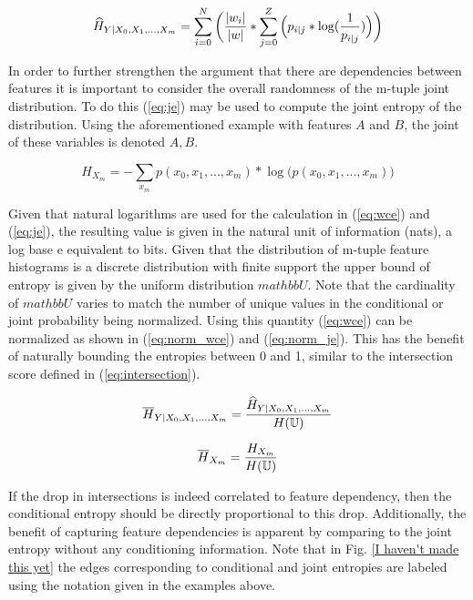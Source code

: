 \begin{equation}
\label{eq:wce}
\widehat{H}_{Y|X_0, X_1, ..., X_m} = \sum_{i=0}^{N} \bigg({{|w_i|} \over {|w|}} * {\sum_{j=0}^{Z}\Big({p_{i|j} * \log ({1 \over{p_{i|j}}})}\Big)}\bigg)
\end{equation}

In order to further strengthen the argument that there are dependencies between features it is important to consider the overall randomness of the m-tuple joint distribution. To do this (\ref{eq:je}) may be used to compute the joint entropy of the distribution. Using the aforementioned example with features $A$ and $B$, the joint of these variables is denoted $A,B$.

\begin{equation}
\label{eq:je}
{H}_{X_m} = -\sum_{x_m} p(x_0, x_1,...,x_m)  * \log \big({{p(x_0,x_1,...,x_m)}}\big)
\end{equation}

Given that natural logarithms are used for the calculation in (\ref{eq:wce}) and (\ref{eq:je}), the resulting value is given in the natural unit of information (nats), a log base e equivalent to bits. Given that the distribution of m-tuple feature histograms is a discrete distribution with finite support the upper bound of entropy is given by the uniform distribution $mathbb{U}$. Note that the cardinality of $mathbb{U}$ varies to match the number of unique values in the conditional or joint probability being normalized. Using this quantity (\ref{eq:wce}) can be normalized as shown in (\ref{eq:norm_wce}) and (\ref{eq:norm_je}). This has the benefit of naturally bounding the entropies between 0 and 1, similar to the intersection score defined in (\ref{eq:intersection}).


\begin{equation}
\label{eq:norm_wce}
\overline{H}_{Y|X_0, X_1, ..., X_m} = {{\widehat{H}_{Y|X_0, X_1, ..., X_m}} \over{ H(\mathbb{U})}}
\end{equation}


\begin{equation}
\label{eq:norm_je}
\overline{H}_{X_m} = {{{H}_{X_m}} \over{ H(\mathbb{U})}}
\end{equation}

If the drop in intersections is indeed correlated to feature dependency, then the conditional entropy should be directly proportional to this drop. Additionally, the benefit of capturing feature dependencies is apparent by comparing to the joint entropy without any conditioning information. Note that in Fig. \ref{I haven't made this yet} the edges corresponding to conditional and joint entropies are labeled using the notation given in the examples above.


